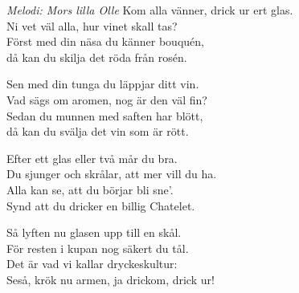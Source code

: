 {\footnotesize\textit{Melodi: Mors lilla Olle}}
\vspace{10pt}
Kom alla vänner, drick ur ert glas.\\
Ni vet väl alla, hur vinet skall tas?\\
Först med din näsa du känner bouquén,\\
då kan du skilja det röda från rosén.\par
\vspace{10pt}
Sen med din tunga du läppjar ditt vin.\\
Vad sägs om aromen, nog är den väl fin?\\
Sedan du munnen med saften har blött,\\
då kan du svälja det vin som är rött.\par
\vspace{10pt}
Efter ett glas eller två mår du bra.\\
Du sjunger och skrålar, att mer vill du ha.\\
Alla kan se, att du börjar bli sne'.\\
Synd att du dricker en billig Chatelet.\par
\vspace{10pt}
Så lyften nu glasen upp till en skål.\\
För resten i kupan nog säkert du tål.\\
Det är vad vi kallar dryckeskultur:\\
Seså, krök nu armen, ja drickom, drick ur!
